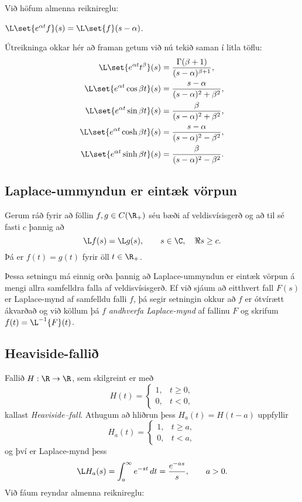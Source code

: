 Við höfum almenna reiknireglu:

\begin{se} $\L\set{e^{\alpha t}f}(s) = \L\set{f}(s-\alpha)$.
\end{se}

Útreikninga okkar hér að framan getum við  nú  tekið saman í litla
töflu: 
\begin{align*}
\L\set{e^{\alpha t}t^{\beta}}(s)
&=\dfrac{\Gamma(\beta+1)}{(s-\alpha)^{\beta+1}},\\
\L\set{e^{\alpha t}\cos \beta t}(s)
&=\dfrac{s-\alpha}{(s-\alpha)^2+\beta^2},\\
\L\set{e^{\alpha t}\sin \beta t}(s)
&=\dfrac{\beta}{(s-\alpha)^2+\beta^2},\\
\L\set{e^{\alpha t}\cosh \beta t}(s)
&=\dfrac{s-\alpha}{(s-\alpha)^2-\beta^2},\\
\L\set{e^{\alpha t}\sinh \beta t}(s)
&=\dfrac{\beta}{(s-\alpha)^2-\beta^2}.
\end{align*}


\subsection*{Laplace-ummyndun er eintæk vörpun}


\begin{se}\label{set:10.1.2}
Gerum ráð fyrir að föllin $f,g\in C(\R_+)$ séu bæði af
veldisvísisgerð og að til sé fasti $c$ þannig að 
 $$\L f(s)=\L g(s), \qquad s\in \C, \quad \Re s\geq c.
 $$
Þá er $f(t)=g(t)$ fyrir öll $t\in \R_+$. 
\end{se}


Þessa setningu má einnig orða þannig að Laplace-ummyndun er eintæk
vörpun á mengi allra samfelldra falla af veldisvísisgerð.  
Ef við sjáum að eitthvert fall $F(s)$ er Laplace-mynd af samfelldu 
falli $f$, 
þá segir setningin okkur að $f$ er ótvírætt ákvarðað og við köllum þá
$f$ {\it andhverfa Laplace-mynd } af fallinu $F$ og skrifum
$f(t)=\L^{-1}\{F\}(t)$.


\subsection*{Heaviside-fallið}

Fallið $H:\R\to \R$, sem skilgreint er með
\begin{equation*}
H(t)=\begin{cases} 1, &t\geq 0,\\ 0, & t<0,\end{cases}\label{7.1.5}
\end{equation*}
kallast {\it Heaviside--fall}.  Athugum að
hliðrun þess $H_a(t)=H(t-a)$ uppfyllir
\begin{equation*}
H_a(t)=\begin{cases} 1, &t\geq a,\\ 0, & t<a,\end{cases}\label{7.1.6}
\end{equation*}
og því er Laplace-mynd þess
\begin{equation*}
\L H_a(s)= \int_a^{\infty} e^{-st}\, dt= \dfrac{e^{-as}} s, \qquad a>0.
\label{7.1.7}
\end{equation*}
Við fáum reyndar almenna reiknireglu:

